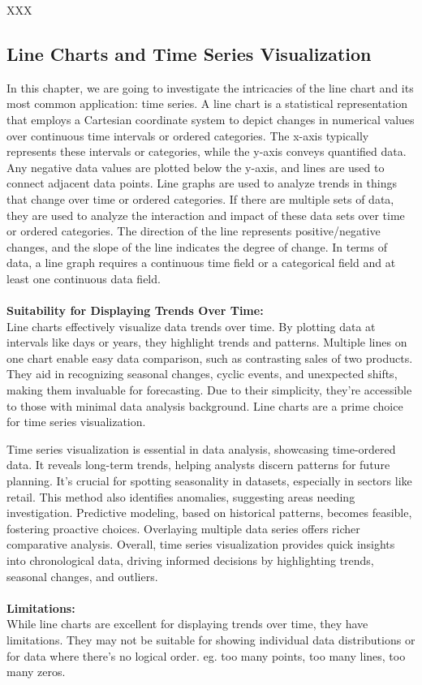 \documentclass{article}\usepackage[]{graphicx}\usepackage[]{xcolor}
\begin{document}
XXX %


\subsection{Line Charts and Time Series Visualization}

In this chapter, we are going to investigate the intricacies of the line chart and its most common application: time series. A line chart is a statistical representation that employs a Cartesian coordinate system to depict changes in numerical values over continuous time intervals or ordered categories. The x-axis typically represents these intervals or categories, while the y-axis conveys quantified data. Any negative data values are plotted below the y-axis, and lines are used to connect adjacent data points.
Line graphs are used to analyze trends in things that change over time or ordered categories. If there are multiple sets of data, they are used to analyze the interaction and impact of these data sets over time or ordered categories. The direction of the line represents positive/negative changes, and the slope of the line indicates the degree of change. In terms of data, a line graph requires a continuous time field or a categorical field and at least one continuous data field.\\\\
\textbf{Suitability for Displaying Trends Over Time:}\\
Line charts effectively visualize data trends over time. By plotting data at intervals like days or years, they highlight trends and patterns. Multiple lines on one chart enable easy data comparison, such as contrasting sales of two products. They aid in recognizing seasonal changes, cyclic events, and unexpected shifts, making them invaluable for forecasting. Due to their simplicity, they're accessible to those with minimal data analysis background. Line charts are a prime choice for time series visualization.

Time series visualization is essential in data analysis, showcasing time-ordered data. It reveals long-term trends, helping analysts discern patterns for future planning. It's crucial for spotting seasonality in datasets, especially in sectors like retail. This method also identifies anomalies, suggesting areas needing investigation. Predictive modeling, based on historical patterns, becomes feasible, fostering proactive choices. Overlaying multiple data series offers richer comparative analysis. Overall, time series visualization provides quick insights into chronological data, driving informed decisions by highlighting trends, seasonal changes, and outliers.\\\\
\textbf{Limitations:}\\
While line charts are excellent for displaying trends over time, they have limitations. They may not be suitable for showing individual data distributions or for data where there's no logical order. eg. too many points, too many lines, too many zeros.
\end{document}
